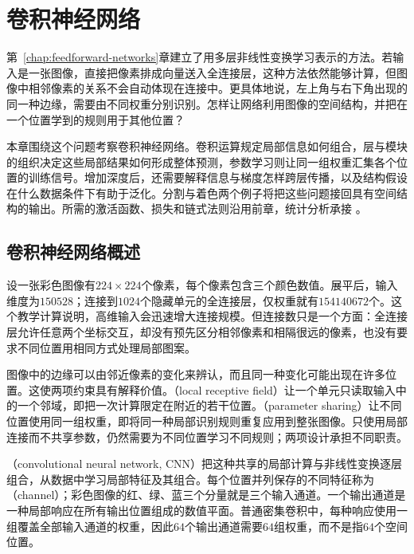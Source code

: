 \chapter{卷积神经网络}
\label{chap:convolutional-networks}

第~\ref{chap:feedforward-networks}章建立了用多层非线性变换学习表示的方法。若输入是一张图像，直接把像素排成向量送入全连接层，这种方法依然能够计算，但图像中相邻像素的关系不会自动体现在连接中。更具体地说，左上角与右下角出现的同一种边缘，需要由不同权重分别识别。怎样让网络利用图像的空间结构，并把在一个位置学到的规则用于其他位置？

本章围绕这个问题考察卷积神经网络。卷积运算规定局部信息如何组合，层与模块的组织决定这些局部结果如何形成整体预测，参数学习则让同一组权重汇集各个位置的训练信号。增加深度后，还需要解释信息与梯度怎样跨层传播，以及结构假设在什么数据条件下有助于泛化。分割与着色两个例子将把这些问题接回具有空间结构的输出。所需的激活函数、损失和链式法则沿用前章，统计分析承接
。

\section{卷积神经网络概述}
\label{sec:cnn-overview}

设一张彩色图像有$224\times224$个像素，每个像素包含三个颜色数值。展平后，输入维度为$150528$；连接到$1024$个隐藏单元的全连接层，仅权重就有$154140672$个。这个教学计算说明，高维输入会迅速增大连接规模。但连接数只是一个方面：全连接层允许任意两个坐标交互，却没有预先区分相邻像素和相隔很远的像素，也没有要求不同位置用相同方式处理局部图案。

图像中的边缘可以由邻近像素的变化来辨认，而且同一种变化可能出现在许多位置。这使两项约束具有解释价值。（local receptive field）让一个单元只读取输入中的一个邻域，即把一次计算限定在附近的若干位置。（parameter sharing）让不同位置使用同一组权重，即将同一种局部识别规则重复应用到整张图像。只使用局部连接而不共享参数，仍然需要为不同位置学习不同规则；两项设计承担不同职责。

（convolutional neural network, CNN）把这种共享的局部计算与非线性变换逐层组合，从数据中学习局部特征及其组合。每个位置并列保存的不同特征称为（channel）；彩色图像的红、绿、蓝三个分量就是三个输入通道。一个输出通道是一种局部响应在所有输出位置组成的数值平面。普通密集卷积中，每种响应使用一组覆盖全部输入通道的权重，因此$64$个输出通道需要$64$组权重，而不是指$64$个空间位置。


